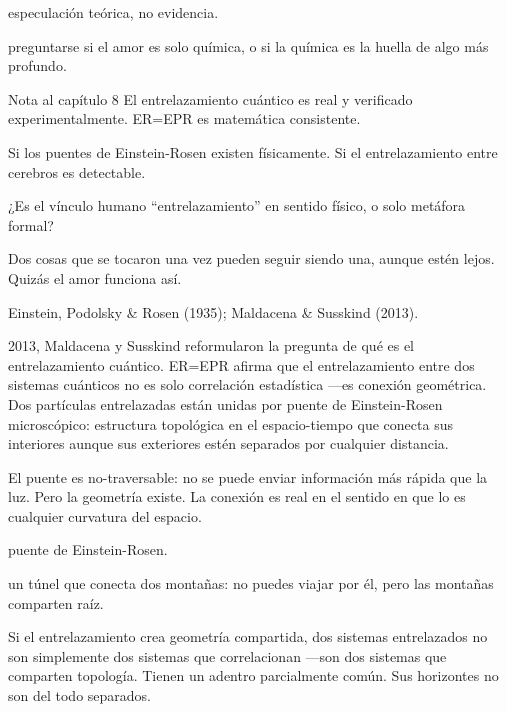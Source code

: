 \begin{fisica}
 especulación teórica, no evidencia.

 preguntarse si el amor es solo química, o si la química es la huella de algo más profundo.
\end{fisica}
\begin{notacap}{Nota al capítulo 8}
 El entrelazamiento cuántico es real y verificado experimentalmente. ER=EPR es matemática consistente.

 Si los puentes de Einstein-Rosen existen físicamente. Si el entrelazamiento entre cerebros es detectable.

 ¿Es el vínculo humano “entrelazamiento” en sentido físico, o solo metáfora formal?

 Dos cosas que se tocaron una vez pueden seguir siendo una, aunque estén lejos. Quizás el amor funciona así.

 Einstein, Podolsky \& Rosen (1935); Maldacena \& Susskind (2013).
\end{notacap}
\noindent {} 2013, Maldacena y Susskind reformularon la pregunta de qué es el entrelazamiento cuántico. ER=EPR afirma que el entrelazamiento entre dos sistemas cuánticos no es solo correlación estadística —es conexión geométrica. Dos partículas entrelazadas están unidas por puente de Einstein-Rosen microscópico: estructura topológica en el espacio-tiempo que conecta sus interiores aunque sus exteriores estén separados por cualquier distancia.

El puente es no-traversable: no se puede enviar información más rápida que la luz. Pero la geometría existe. La conexión es real en el sentido en que lo es cualquier curvatura del espacio.

\begin{fisica}
 puente de Einstein-Rosen.

 un túnel que conecta dos montañas: no puedes viajar por él, pero las montañas comparten raíz.
\end{fisica}
Si el entrelazamiento crea geometría compartida, dos sistemas entrelazados no son simplemente dos sistemas que correlacionan —son dos sistemas que comparten topología. Tienen un adentro parcialmente común. Sus horizontes no son del todo separados.

